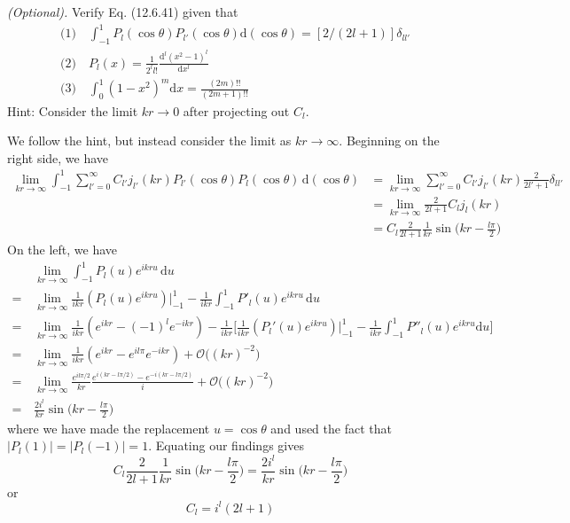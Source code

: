 \documentclass[../principles-of-quantum-mechanics.tex]{subfiles}
\begin{document}
\begin{questions}
		\question \textit{(Optional).} Verify Eq. (12.6.41) given that
		\begin{align*}
			&\text{(1)}\quad\int_{-1}^1P_l(\cos\theta)P_{l'}(\cos\theta)\mathrm{d}(\cos\theta) = [2/(2l + 1)]\delta_{ll'} \\
			&\text{(2)}\quad P_l(x) = \frac{1}{2^ll!}\frac{\mathrm{d}^l(x^2 - 1)^l}{\mathrm{d}x^l} \\
			&\text{(3)}\quad\int_0^1(1 - x^2)^m\mathrm{d}x = \frac{(2m)!!}{(2m + 1)!!}
		\end{align*}
		Hint: Consider the limit $kr \to 0$ after projecting out $C_l$.
		
		\begin{solution}
			We follow the hint, but instead consider the limit as $kr \to \infty$. Beginning on the right side, we have
			\begin{align*}
				\lim_{kr\to\infty}\int_{-1}^1\sum_{l'=0}^{\infty}C_{l'}j_{l'}(kr)P_{l'}(\cos\theta)P_l(\cos\theta)\,\mathrm{d}(\cos\theta) &= \lim_{kr\to\infty}\sum_{l'=0}^{\infty}C_{l'}j_{l'}(kr)\frac{2}{2l' + 1}\delta_{ll'} \\
				&= \lim_{kr\to\infty}\frac{2}{2l + 1}C_lj_l(kr) \\
				&= C_l\frac{2}{2l + 1}\frac{1}{kr}\sin\Big(kr - \frac{l\pi}{2}\Big)
			\end{align*}
			On the left, we have
			\begin{align*}
				&\lim_{kr\to\infty}\int_{-1}^1P_l(u)e^{ikru}\,\mathrm{d}u \\
				=\,&\lim_{kr\to\infty}\frac{1}{ikr}(P_l(u)e^{ikru})\Big|_{-1}^1 - \frac{1}{ikr}\int_{-1}^1P'_l(u)e^{ikru}\,\mathrm{d}u \\
				=\,&\lim_{kr\to\infty}\frac{1}{ikr}(e^{ikr} - (-1)^le^{-ikr}) - \frac{1}{ikr}\Big[\frac{1}{ikr}(P_l'(u)e^{ikru})\Big|_{-1}^1 - \frac{1}{ikr}\int_{-1}^1P''_l(u)e^{ikru}\mathrm{d}u\Big] \\
				=\,&\lim_{kr\to\infty}\frac{1}{ikr}(e^{ikr} - e^{il\pi}e^{-ikr}) + \mathcal{O}\big((kr)^{-2}\big) \\
				=\,&\lim_{kr\to\infty}\frac{e^{il\pi/2}}{kr}\frac{e^{i(kr - l\pi/2)} - e^{-i(kr - l\pi/2)}}{i} + \mathcal{O}\big((kr)^{-2}\big) \\
				=\,&\frac{2i^l}{kr}\sin\Big(kr - \frac{l\pi}{2}\Big)
			\end{align*}
			where we have made the replacement $u = \cos\theta$ and used the fact that $|P_l(1)| = |P_l(-1)| = 1$. Equating our findings gives
			$$C_l\frac{2}{2l + 1}\frac{1}{kr}\sin\Big(kr - \frac{l\pi}{2}\Big) = \frac{2i^l}{kr}\sin\Big(kr - \frac{l\pi}{2}\Big)$$
			or
			$$C_l = i^l(2l + 1)$$
		\end{solution}
	

\end{questions}
\end{document}
